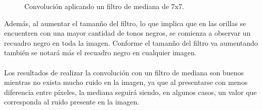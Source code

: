 \documentclass[conference]{IEEEtran}
\begin{document}
\begin{figure}[h]
	\centering
	\caption{Convoluci\'on aplicando un filtro de mediana de 7x7.}	
\end{figure}

Adem\'as, al aumentar el taman\~no del filtro, lo que implica que en las orillas se encuentren con una mayor cantidad de tonos negros, se comienza a observar un recuadro negro en toda la imagen. Conforme el taman\~no del filtro va aumentando tambi\'en se notar\'a m\'as el recuadro negro en cualquier imagen.\\\\
Los resultados de realizar la convoluci\'on con un filtro de mediana son buenos mientras no exista mucho ruido en la imagen, ya que al presentarse con menos diferencia entre p\'ixeles, la mediana seguir\'a siendo, en algunos casos, un valor que corresponda al ruido presente en la imagen.\\\\
\end{document}
